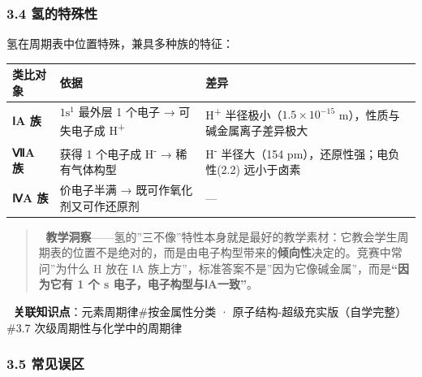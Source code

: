 \documentclass[a4paper,11pt]{ctexart}
\newcounter{none}
\begin{document}
\subsubsection{3.4 氢的特殊性}\label{ux6c22ux7684ux7279ux6b8aux6027}

氢在周期表中位置特殊，兼具多种族的特征：

{\def\LTcaptype{none} %
\begin{longtable}[]{@{}
  >{\raggedright\arraybackslash}p{}
  >{\raggedright\arraybackslash}p{}
  >{\raggedright\arraybackslash}p{}@{}}
\toprule\noalign{}
\begin{minipage}[b]{\linewidth}\raggedright
类比对象
\end{minipage} & \begin{minipage}[b]{\linewidth}\raggedright
依据
\end{minipage} & \begin{minipage}[b]{\linewidth}\raggedright
差异
\end{minipage} \\
\midrule\noalign{}
\endhead
\bottomrule\noalign{}
\endlastfoot
\textbf{ⅠA 族} & \(1\mathrm{s}^1\) 最外层 1 个电子 → 可失电子成 H\textsuperscript{+} & H\textsuperscript{+} 半径极小（\(1.5\times10^{-15}\) m），性质与碱金属离子差异极大 \\
\textbf{ⅦA 族} & 获得 1 个电子成 H\textsuperscript{-} → 稀有气体构型 & H\textsuperscript{-} 半径大（154 pm），还原性强；电负性(2.2) 远小于卤素 \\
\textbf{ⅣA 族} & 价电子半满 → 既可作氧化剂又可作还原剂 & --- \\
\end{longtable}
}

\begin{quote}
🧠 \textbf{教学洞察}------氢的''三不像''特性本身就是最好的教学素材：它教会学生周期表的位置不是绝对的，而是由电子构型带来的\textbf{倾向性}决定的。竞赛中常问''为什么 H 放在 ⅠA 族上方''，标准答案不是''因为它像碱金属''，而是\textbf{``因为它有 1 个 s 电子，电子构型与ⅠA一致''}。
\end{quote}

🔗 \textbf{关联知识点}：元素周期律\#按金属性分类 · 原子结构-超级充实版（自学完整）\#3.7 次级周期性与化学中的周期律

\subsubsection{3.5 常见误区}\label{ux5e38ux89c1ux8befux533a}
\end{document}
